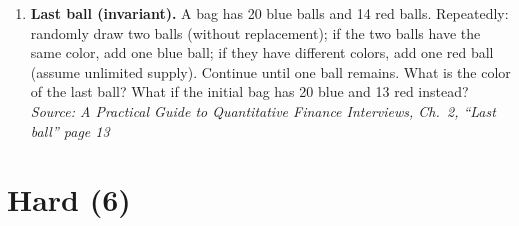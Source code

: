 \documentclass[11pt]{article}
\begin{document}
\begin{enumerate}[label=\textbf{\arabic*.}, resume]
\item \textbf{Last ball (invariant).} A bag has 20 blue balls and 14 red balls. Repeatedly: randomly draw two balls (without replacement); if the two balls have the same color, add one blue ball; if they have different colors, add one red ball (assume unlimited supply). Continue until one ball remains. What is the color of the last ball? What if the initial bag has 20 blue and 13 red instead?\\
\hfill{\small\textit{Source: A Practical Guide to Quantitative Finance Interviews, Ch.\ 2, ``Last ball'' page 13}}
\end{enumerate}

\section*{Hard (6)}
\end{document}
